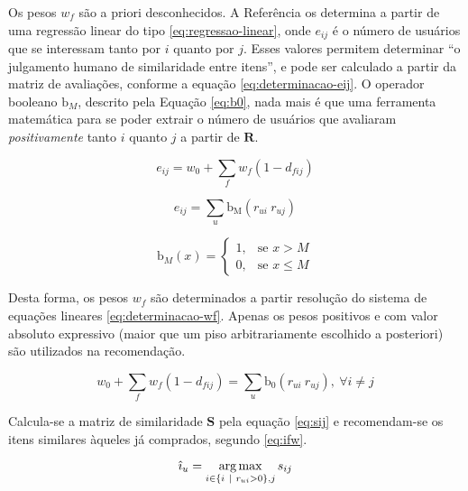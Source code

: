 Os pesos $w_f$ são a priori desconhecidos. A Referência  os determina a partir de uma regressão linear do tipo \ref{eq:regressao-linear}, onde $e_{ij}$ é o número de usuários que se interessam tanto por $i$ quanto por $j$. Esses valores permitem determinar ``o julgamento humano de similaridade entre itens'', e pode ser calculado a partir da matriz de avaliações, conforme a equação \ref{eq:determinacao-eij}. O operador booleano $\mathrm{b}_M$, descrito pela Equação \ref{eq:b0}, nada mais é que uma ferramenta matemática para se poder extrair o número de usuários que avaliaram \textit{positivamente} tanto $i$ quanto $j$ a partir de $\mathbf{R}$. 

\begin{equation}
\label{eq:regressao-linear} 
    e_{ij} = w_0 + \sum_{f}{w_{f} \left(1-d_{fij}\right)}
\end{equation} 


\begin{equation}
\label{eq:determinacao-eij} 
    e_{ij} = \sum_{u}{\mathrm{b_M}\left(r_{ui} ~ r_{uj}\right)}
\end{equation} 

\begin{equation}
\label{eq:b0}
\mathrm{b}_M\left(x\right) = 
\begin{cases}
1, &\text{se }x>M \\
0, &\text{se }x\leq M
\end{cases} 
\end{equation}

Desta forma, os pesos $w_f$ são determinados a partir resolução do sistema de equações lineares \ref{eq:determinacao-wf}. Apenas os pesos positivos e com valor absoluto expressivo (maior que um piso arbitrariamente escolhido a posteriori) são utilizados na recomendação. 

\begin{equation}
\label{eq:determinacao-wf} 
    w_0 + \sum_{f}{w_{f}  \left(1-d_{fij}\right)} = \sum_{u}{\mathrm{b_0}\left(r_{ui} ~ r_{uj}\right)},~\forall i \neq j 
\end{equation} 

Calcula-se a matriz de similaridade $\mathbf{S}$ pela equação \ref{eq:sij} e recomendam-se os itens similares àqueles já comprados, segundo \ref{eq:ifw}.

\begin{equation}
\label{eq:ifw} 
    \hat{\imath}_u = \operatorname*{arg\,max}_{i \in \left\{i~|~r_{ui} > 0\right\}, j}{s_{ij}}
\end{equation} 

